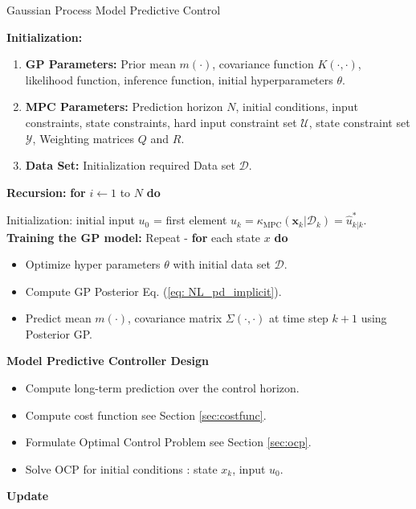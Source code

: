 \begin{algorithm}
    \caption{Gaussian Process Model Predictive Control}
    \label{alg:gp_mpc}
    \textbf{Initialization:}
    \begin{enumerate}
        \item \textbf{GP Parameters:} Prior mean \( m(\cdot) \), covariance function \( K(\cdot,\cdot) \), likelihood function, inference function, initial hyperparameters \( \theta \).
        \item \textbf{MPC Parameters:} Prediction horizon \( N \), initial conditions, input constraints, state constraints, hard input constraint set \( \mathcal{U} \), state constraint set \( \mathcal{Y} \), Weighting matrices \( Q \) and \( R \).
        \item \textbf{Data Set:} Initialization required Data set \( \mathcal{D} \).
    \end{enumerate}
    \textbf{Recursion:} \textbf{for }{$i \gets 1$ to $N$} \textbf{ do}
    \begin{algorithmic}[1]
        \State Initialization: initial input \( u_0 \) = first element \( u_k = \kappa_{\text{MPC}}(\mathbf{x}_k | \mathcal{D}_k) = \hat{u}_{k|k}^* \).
        \State \textbf{Training the GP model:} Repeat - \textbf{for} each state \( x \) \textbf{do}
        \begin{itemize} 
            \item Optimize hyper parameters \( \theta \) with initial data set \(\mathcal{D}\).
            \item Compute GP Posterior Eq. (\ref{eq: NL_pd_implicit}).
            \item Predict mean \( m(\cdot) \), covariance matrix \( \Sigma(\cdot,\cdot) \) at time step \(k+1\) using Posterior GP.
        \end{itemize}
        \State \textbf{Model Predictive Controller Design}
        \begin{itemize}
            \item Compute long-term prediction over the control horizon.
            \item Compute cost function see Section \ref{sec:costfunc}.
            \item Formulate Optimal Control Problem see Section \ref{sec:ocp}.
            \item Solve OCP for initial conditions : state \(x_k\), input \( u_0 \). 
        \end{itemize}
        \State \textbf{Update}
        \begin{itemize}

\end{itemize}
\end{algorithmic}
\end{algorithm}
